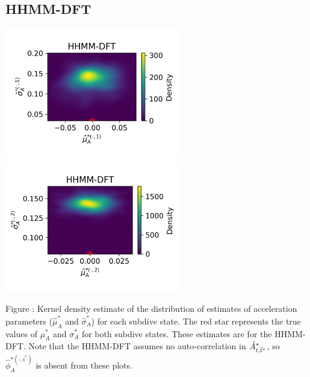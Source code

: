 \documentclass{article}
\begin{document}
        \subsection{HHMM-DFT}
        \begin{center}
        \includegraphics[width=3in]{../Plots/hhmm_FV_uncorr_MLE_density_A_0_0.png}
        \includegraphics[width=3in]{../Plots/hhmm_FV_uncorr_MLE_density_A_0_1.png}
        \end{center}
        
        \noindent Figure : Kernel density estimate of the distribution of estimates of acceleration parameters ($\hat \mu^*_A$ and $\hat \sigma^*_A$) for each subdive state. The red star represents the true values of $\mu^*_A$ and $\sigma^*_A$ for both subdive states. These estimates are for the HHMM-DFT. Note that the HHMM-DFT assumes no auto-correlation in $\tilde{A}^*_{t,\tilde t^*}$, so $\hat \phi_A^{*(\cdot,i^*)}$ is absent from these plots.
        \addtocounter{fignum}{1}
        
\end{document}
